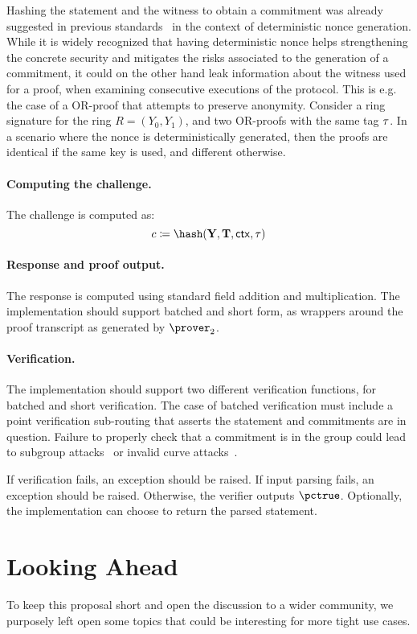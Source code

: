 \documentclass[runningheads]{llncs}
\begin{document}
Hashing the statement and the witness to obtain a commitment was already suggested in previous standards~\cite{rfc6979} in the context of deterministic nonce generation.
While it is widely recognized that having deterministic nonce helps strengthening the concrete security  and mitigates the risks associated to the generation of a commitment, it could on the other hand leak information about the witness used for a proof, when examining consecutive executions of the protocol. This is e.g. the case of a OR-proof that attempts to preserve anonymity.
Consider a ring signature for the ring \(R = (Y_0 , Y_1)\),
and two OR-proofs with the same tag $\tau$.  In a scenario where the nonce is deterministically generated, then the proofs are identical if the same key is used, and different otherwise.

\paragraph{Computing the challenge.}
The challenge is computed as:
\[
  c \defeq \hash(\vec \statement, \vec \commitment, \ctx, \stag)
\]

\paragraph{Response and proof output.} The response is computed using standard field addition and multiplication. The implementation should support batched and short form, as wrappers around the proof transcript as generated by $\prover_2$.
\paragraph{Verification.} The implementation should support two different verification functions, for batched and short verification.
The case of batched verification must include a point verification sub-routing that asserts the statement and commitments are in question. Failure to properly check that a commitment is in the group could lead to subgroup attacks~\cite{EC:VanWie96,C:LimLee97} or invalid curve attacks~\cite{C:BieMeyMul00,RSA:BBPV12}.

If verification fails, an exception should be raised.
If input parsing fails, an exception should be raised.
Otherwise, the verifier outputs $\pctrue$. Optionally, the implementation can choose to return the parsed statement.





\section{Looking Ahead}
To keep this proposal short and open the discussion to a wider community, we purposely left open some topics that could
be interesting for more tight use cases.
\end{document}
